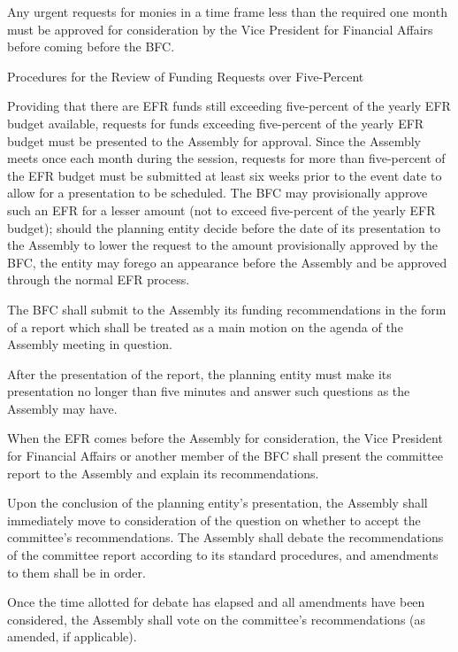 \begin{bylaws-number}
\begin{bylaws-number}
  \item Any urgent requests for monies in a time frame less than the required one month must be approved for consideration by the Vice President for Financial Affairs before coming before the BFC.
\end{bylaws-number}
  \item Procedures for the Review of Funding Requests over Five-Percent
\begin{bylaws-number}
  \item Providing that there are EFR funds still exceeding five-percent of the yearly EFR budget available, requests for funds exceeding five-percent of the yearly EFR budget must be presented to the Assembly for approval. Since the Assembly meets once each month during the session, requests for more than five-percent of the EFR budget must be submitted at least six weeks prior to the event date to allow for a presentation to be scheduled. The BFC may provisionally approve such an EFR for a lesser amount (not to exceed five-percent of the yearly EFR budget); should the planning entity decide before the date of its presentation to the Assembly to lower the request to the amount provisionally approved by the BFC, the entity may forego an appearance before the Assembly and be approved through the normal EFR process.
  \item The BFC shall submit to the Assembly its funding recommendations in the form of a report which shall be treated as a main motion on the agenda of the Assembly meeting in question.
  \item After the presentation of the report, the planning entity must make its presentation no longer than five minutes and answer such questions as the Assembly may have.
  \item When the EFR comes before the Assembly for consideration, the Vice President for Financial Affairs or another member of the BFC shall present the committee report to the Assembly and explain its recommendations.
  \item Upon the conclusion of the planning entity’s presentation, the Assembly shall immediately move to consideration of the question on whether to accept the committee’s recommendations. The Assembly shall debate the recommendations of the committee report according to its standard procedures, and amendments to them shall be in order.
  \item Once the time allotted for debate has elapsed and all amendments have been considered, the Assembly shall vote on the committee’s recommendations (as amended, if applicable).

\end{bylaws-number}
\end{bylaws-number}
